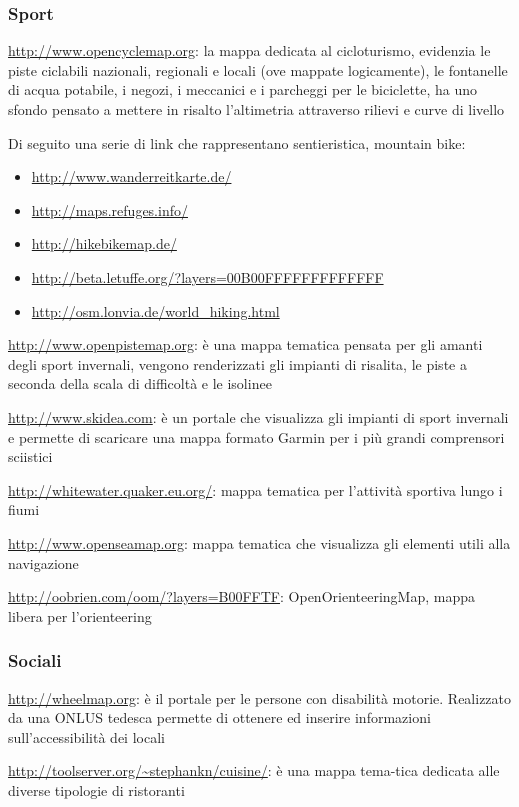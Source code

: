 \documentclass[a4paper,twoside,12pt,]{article}
\begin{document}
\subsubsection{Sport}
\url{http://www.opencyclemap.org}: la mappa dedicata al cicloturismo, evidenzia le piste ciclabili nazionali, regionali e locali (ove mappate logicamente), le fontanelle di acqua potabile, i negozi, i meccanici e i parcheggi per le biciclette, ha uno sfondo pensato a mettere in risalto l'altimetria attraverso rilievi e curve di livello

Di seguito una serie di link che rappresentano sentieristica, mountain bike:
\begin{itemize}
 \item \url{http://www.wanderreitkarte.de/}
 \item \url{http://maps.refuges.info/}
 \item \url{http://hikebikemap.de/}
 \item \url{http://beta.letuffe.org/?layers=00B00FFFFFFFFFFFFF}
 \item \url{http://osm.lonvia.de/world_hiking.html}
\end{itemize}

\url{http://www.openpistemap.org}: è una mappa tematica pensata per gli amanti degli sport invernali, vengono renderizzati gli impianti di risalita, le piste a seconda della scala di difficoltà e le isolinee

\url{http://www.skidea.com}: è un portale che visualizza gli impianti di sport invernali e permette di scaricare una mappa formato Garmin per i più grandi comprensori sciistici

\url{http://whitewater.quaker.eu.org/}: mappa tematica per l'attività sportiva lungo i fiumi

\url{http://www.openseamap.org}: mappa tematica che visualizza gli elementi utili alla navigazione

\url{http://oobrien.com/oom/?layers=B00FFTF}: OpenOrienteeringMap, mappa libera per l'orienteering

\subsubsection{Sociali}

\url{http://wheelmap.org}: è il portale per le persone con disabilità motorie. Realizzato da una ONLUS tedesca permette di ottenere ed inserire informazioni sull'accessibilità dei locali

\url{http://toolserver.org/~stephankn/cuisine/}: è una mappa tema-tica dedicata alle diverse tipologie di ristoranti
\end{document}
